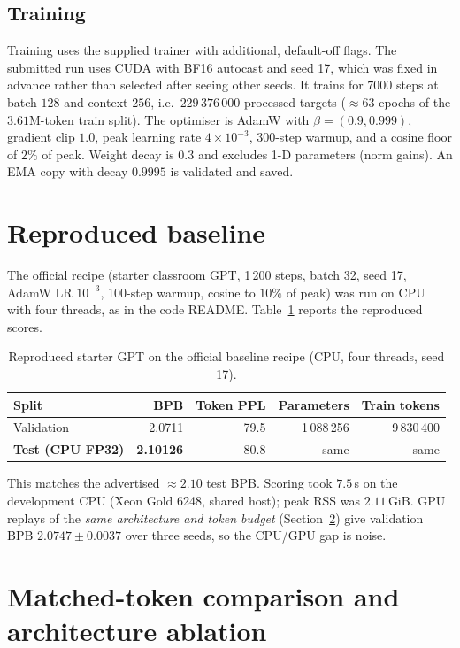 \documentclass[11pt,a4paper]{article}
\begin{document}
\subsection{Training}

Training uses the supplied trainer with additional, default-off flags. The submitted run uses CUDA with BF16 autocast and seed 17, which was fixed in advance rather than selected after seeing other seeds. It trains for $7000$ steps at batch $128$ and context $256$, i.e.\ $229\,376\,000$ processed targets ($\approx 63$ epochs of the $3.61$M-token train split). The optimiser is AdamW with $\beta=(0.9,0.999)$, gradient clip $1.0$, peak learning rate $4\times 10^{-3}$, $300$-step warmup, and a cosine floor of $2\%$ of peak. Weight decay is $0.3$ and excludes 1-D parameters (norm gains). An EMA copy with decay $0.9995$ is validated and saved.

\section{Reproduced baseline}

The official recipe (starter classroom GPT, 1\,200 steps, batch 32, seed 17, AdamW LR $10^{-3}$, 100-step warmup, cosine to $10\%$ of peak) was run on CPU with four threads, as in the code README. Table~\ref{tab:baseline} reports the reproduced scores.

\begin{table}[t]
\centering
\caption{Reproduced starter GPT on the official baseline recipe (CPU, four threads, seed 17).}
\label{tab:baseline}
\small
\begin{tabular}{lrrrr}
\toprule
Split & BPB & Token PPL & Parameters & Train tokens \\
\midrule
Validation & 2.0711 & 79.5 & 1\,088\,256 & 9\,830\,400 \\
\textbf{Test (CPU FP32)} & \textbf{2.10126} & 80.8 & same & same \\
\bottomrule
\end{tabular}
\end{table}

This matches the advertised $\approx 2.10$ test BPB. Scoring took $7.5$\,s on the development CPU (Xeon Gold 6248, shared host); peak RSS was $2.11$\,GiB. GPU replays of the \emph{same architecture and token budget} (Section~\ref{sec:matched}) give validation BPB $2.0747\pm 0.0037$ over three seeds, so the CPU/GPU gap is noise.

\section{Matched-token comparison and architecture ablation}
\label{sec:matched}
\end{document}
